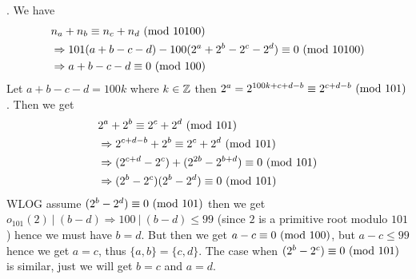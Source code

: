 \begin{soln} .
    We have 
    \begin{align*}
        &n_a + n_b \equiv n_c + n_d \ (\mbox{mod } 10100) \\
        &\Rightarrow 101(a+b-c-d) - 100(2^a+2^b-2^c-2^d) \equiv 0 \ (\mbox{mod } 10100) \\
        &\Rightarrow a+b-c-d \equiv 0 \ (\mbox{mod } 100)
    \end{align*}
    Let $a+b-c-d = 100k$ where $ k \in \mathbb{Z} $ then $ 2^a = 2^{100k +c+d-b} \equiv 2^{c+d-b} \ (\mbox{mod } 101) $. Then we get 
    \begin{align*}
        &2^a + 2^b \equiv 2^c + 2^d \ (\mbox{mod } 101) \\
        &\Rightarrow 2^{c+d-b} + 2^b \equiv 2^c + 2^d \ (\mbox{mod } 101) \\
        &\Rightarrow (2^{c+d} - 2^c)+ (2^{2b}-2^{b+d}) \equiv 0 \ (\mbox{mod } 101)\\
        &\Rightarrow (2^b-2^c)(2^b-2^d) \equiv 0 \ (\mbox{mod } 101) 
    \end{align*}
    WLOG assume $(2^b -2^d) \equiv 0 \ (\mbox{mod } 101)$ then we get $o_{101}(2) \ | \ (b-d) \Rightarrow 100 \ | \ (b-d) \leq 99 $ (since $2$ is a primitive root modulo $101$) hence we must have $b=d$. But then we get $a-c \equiv 0 \ (\mbox{mod } 100)$, but $a-c \leq 99$ hence we get $a = c$, thus $\{a,b\} = \{c,d\}$. The case when $(2^b-2^c) \equiv 0 \ (\mbox{mod } 101)$ is similar, just we will get $b=c$ and $a=d$.
\end{soln}